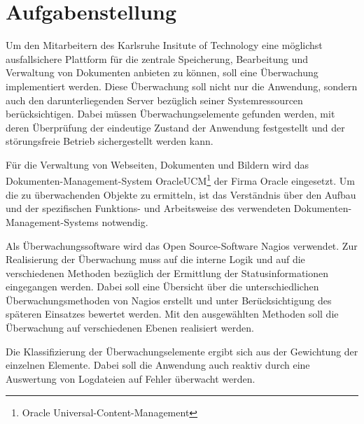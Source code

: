 \section{Aufgabenstellung}

Um den Mitarbeitern des Karlsruhe Insitute of Technology eine möglichst ausfallsichere Plattform für die zentrale Speicherung, Bearbeitung und Verwaltung von Dokumenten anbieten zu können, soll eine Überwachung implementiert werden.
Diese Überwachung soll nicht nur die Anwendung, sondern auch den darunterliegenden Server bezüglich seiner Systemressourcen berücksichtigen.
Dabei müssen Überwachungselemente gefunden werden, mit deren Überprüfung der eindeutige Zustand der Anwendung festgestellt und der störungsfreie Betrieb sichergestellt werden kann.

Für die Verwaltung von Webseiten, Dokumenten und Bildern wird das Dokumenten-Management-System \gls{OracleUCM}\footnote{Oracle Universal-Content-Management} der Firma Oracle eingesetzt.
Um die zu überwachenden Objekte zu ermitteln, ist das Verständnis über den Aufbau und der spezifischen Funktions- und Arbeitsweise des verwendeten Dokumenten-Management-Systems notwendig.

Als Überwachungssoftware wird das Open Source-Software Nagios verwendet.
Zur Realisierung der Überwachung muss auf die interne Logik und auf die verschiedenen Methoden bezüglich der Ermittlung der Statusinformationen eingegangen werden.
Dabei soll eine Übersicht über die unterschiedlichen Überwachungsmethoden von Nagios erstellt und unter Berücksichtigung des späteren Einsatzes bewertet werden.
Mit den ausgewählten Methoden soll die Überwachung auf verschiedenen Ebenen realisiert werden.

Die Klassifizierung der Überwachungselemente ergibt sich aus der Gewichtung der einzelnen Elemente.
Dabei soll die Anwendung auch reaktiv durch eine Auswertung von Logdateien auf Fehler überwacht werden.


